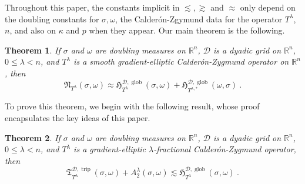 \documentclass{amsart}%
\newtheorem{theorem}{Theorem}
\theoremstyle{plain}
\numberwithin{equation}{section}
\begin{document}
Throughout this paper, the  constants implicit  in $\lesssim, \gtrsim$ and
$\approx$ only depend on the doubling constants for
$\sigma,\omega$, the Calder\'{o}n-Zgymund data for the 
operator $T^{\lambda}$, $n$, and also on $\kappa$ and $p$ when they appear. Our main theorem is the following.
\begin{theorem}
\label{thm:main_L2} \label{main'}If $\sigma$ and $\omega$ are doubling
measures on $\mathbb{R}^{n}$, $\mathcal{D}$ is a dyadic grid on $\mathbb{R}%
^{n}$, $0\leq\lambda<n$, and $T^{\lambda}$ is a smooth gradient-elliptic Calder\'{o}n-Zygmund
operator on $\mathbb{R}^{n}$, then%
\[
\mathfrak{N}_{T^{\lambda}}\left(  \sigma,\omega\right)  \approx\mathfrak{H}%
_{T^{\lambda}}^{\mathcal{D},\operatorname*{glob}}\left(  \sigma,\omega\right)
+\mathfrak{H}_{T^{\lambda,\ast}}^{\mathcal{D},\operatorname*{glob}}\left(
\omega,\sigma\right)  \ .
\]

\end{theorem}

To prove this theorem, we begin with the following result, whose proof encapsulates the key ideas of this paper.

\begin{theorem}
\label{Haar}If $\sigma$ and $\omega$ are doubling measures on $\mathbb{R}^{n}%
$, $\mathcal{D}$ is a dyadic grid on $\mathbb{R}^{n}$, $0\leq\lambda<n$, and
$T^{\lambda}$ is a gradient-elliptic $\lambda$-fractional Calder\'{o}n-Zygmund
operator, then%
\[
\mathfrak{T}_{T^{\lambda}}^{\mathcal{D},\operatorname*{trip}}\left(
\sigma,\omega\right)  +A_{2}^{\lambda}\left(  \sigma,\omega\right)
\lesssim\mathfrak{H}_{T^{\lambda}}^{\mathcal{D},\operatorname*{glob}}\left(
\sigma,\omega\right)  \ .
\]

\end{theorem}
\end{document}

